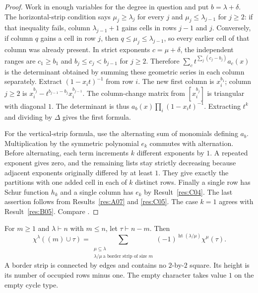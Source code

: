 \begin{proof}
Work in enough variables for the degree in question and put
\(b=\lambda+\delta\). The horizontal-strip condition says
\(\mu_j\ge\lambda_j\) for every \(j\) and
\(\mu_j\le\lambda_{j-1}\) for \(j\ge2\): if that inequality fails,
column \(\lambda_{j-1}+1\) gains cells in rows \(j-1\) and \(j\).
Conversely, if column \(q\) gains a cell in row \(j\), then
\(q\le\mu_j\le\lambda_{j-1}\), so every earlier cell of that column
was already present. In strict
exponents \(c=\mu+\delta\), the independent ranges are \(c_1\ge b_1\)
and \(b_j\le c_j<b_{j-1}\) for \(j\ge2\). Therefore
\(\sum_c t^{\sum_j(c_j-b_j)}a_c(x)\) is the determinant obtained by
summing these geometric series in each column separately. Extract
\((1-x_i t)^{-1}\) from row \(i\). The new first column is \(x_i^{b_1}\);
column \(j\ge2\) is \(x_i^{b_j}-t^{b_{j-1}-b_j}x_i^{b_{j-1}}\).
The column-change matrix from \([x_i^{b_j}]\) is triangular with
diagonal \(1\). The determinant is thus
\(a_b(x)\prod_i(1-x_it)^{-1}\). Extracting \(t^k\) and dividing by
\(\Delta\) gives the first formula.

For the vertical-strip formula, use the alternating sum of
monomials defining \(a_b\). Multiplication by the symmetric
polynomial \(e_k\) commutes with alternation. Before alternating,
each term increments \(k\) different exponents by \(1\). A repeated
exponent gives zero, and the remaining lists stay strictly decreasing
because adjacent exponents originally differed by at least \(1\).
They give exactly the partitions with one added cell in each of
\(k\) distinct rows. Finally a single row has Schur function \(h_k\)
and a single column has \(e_k\) by Result~\ref{res:C04}. The last
assertion follows from Results~\ref{res:A07} and \ref{res:C05}.
The case \(k=1\) agrees with Result~\ref{res:B05}.
Compare \cite[Section 4.9]{sagan}.
\end{proof}

\begin{theorem}\label{res:C08}
For \(m\ge1\) and \(\lambda\vdash n\) with \(m\le n\), let
\(\tau\vdash n-m\). Then
\[
 \chi^\lambda((m)\cup\tau)
   =\sum_{\substack{\mu\subseteq\lambda\\
             \lambda/\mu\ \text{a border strip of size }m}}
        (-1)^{\operatorname{ht}(\lambda/\mu)}\chi^\mu(\tau).
\]
A border strip is connected by edges and contains no \(2\)-by-\(2\)
square. Its height is its number of occupied rows minus one.
The empty character takes value \(1\) on the empty cycle type.
\end{theorem}

